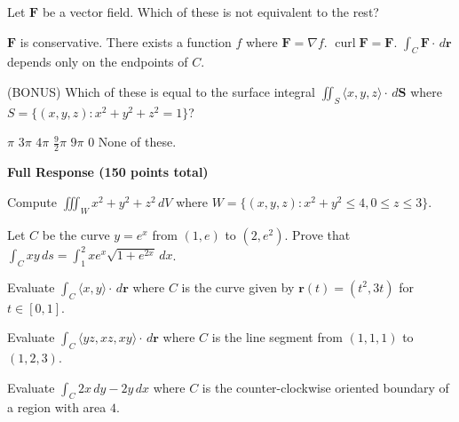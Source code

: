 \documentclass[12pt]{exam}
\newcommand{\vect}[1]{\ensuremath{\mathbf{#1}}}
\newcommand{\<}{\langle}
\renewcommand{\>}{\rangle}
\newcommand{\dvar}{\,d}
\begin{document}
\begin{questions}
\vfill

\question[20]
Let \(\vect F\) be a vector field.
Which of these is not equivalent to the rest?
\begin{checkboxes}
  \choice \(\vect F\) is conservative.
  \choice There exists a function \(f\) where \(\vect F=\nabla f\).
  \choice \(\operatorname{curl}\vect F=\vect F\).
  \choice \(\int_C\vect F\cdot\dvar\vect r\) depends only on the endpoints of \(C\).
\end{checkboxes}

\vfill

\question[10]
(BONUS)
Which of these is equal to the surface integral
\(\iint_S\<x,y,z\>\cdot\dvar\vect S\) where \(S=\{(x,y,z):x^2+y^2+z^2=1\}\)?
\begin{checkboxes}
  \choice \(\pi\)
  \choice \(3\pi\)
  \choice \(4\pi\)
  \choice \(\frac{9}{2}\pi\)
  \choice \(9\pi\)
  \choice \(0\)
  \choice None of these.
\end{checkboxes}


\end{questions}





\vfill
\newpage






\begin{center}
  \textbf{Full Response (150 points total)}
\end{center}

\begin{questions}

\setcounter{question}{6}

\question[30]
  Compute \(\iiint_W x^2+y^2+z^2\dvar V\) where
  \(W=\{(x,y,z):x^2+y^2\leq 4,0\leq z\leq 3\}\).

  \vfill



\newpage

\question[30]
  Let \(C\) be the curve \(y=e^x\) from \((1,e)\) to \((2,e^2)\).
  Prove that \(\int_C xy\dvar s=\int_1^2 xe^x\sqrt{1+e^{2x}}\dvar x\).

  \vfill



\newpage

\question[30]
  Evaluate \(\int_C \<x,y\>\cdot\dvar\vect r\) where \(C\) is the curve
  given by \(\vect r(t)=(t^2,3t)\) for \(t\in[0,1]\).

  \vfill



\newpage

\question[30]
  Evaluate \(\int_C \<yz,xz,xy\>\cdot\dvar\vect r\) where \(C\) is
  the line segment from \((1,1,1)\) to \((1,2,3)\).

  \vfill



\newpage

\question[30]
  Evaluate \(\int_C 2x\dvar y-2y\dvar x\) where \(C\) is the
  counter-clockwise oriented boundary of
  a region with area \(4\).

\end{questions}
\end{document}
